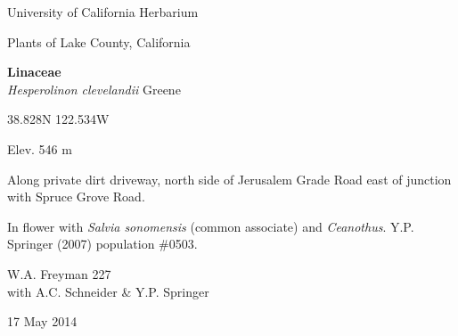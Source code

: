 \documentclass[letterpaper,10pt]{article}
\begin{document}
\begin{minipage}[t]{0.40\textwidth}

\begin{center}
University of California Herbarium \\
\begin{large}
Plants of Lake County, California \\
\end{large}
\vspace{\baselineskip}
\textbf{Linaceae} \\
\textit{Hesperolinon clevelandii} Greene\\
\end{center}

\begin{footnotesize}

\begin{multicols}{2}
38.828\textdegree N 122.534\textdegree W
\columnbreak
\begin{flushright}
Elev. 546 m
\end{flushright}
\end{multicols}

Along private dirt driveway, north side of Jerusalem Grade Road east of junction with Spruce Grove Road.
\vspace{\baselineskip}

In flower with \textit{Salvia sonomensis} (common associate) and \textit{Ceanothus}. Y.P. Springer (2007) population \#0503.

\begin{multicols}{2}
W.A. Freyman 227 \\
with A.C. Schneider \& Y.P. Springer
\columnbreak
\begin{flushright}
17 May 2014
\end{flushright}
\end{multicols}

\end{footnotesize}

\end{minipage}

\vspace{2cm}
%
%

%
%
\end{document}
